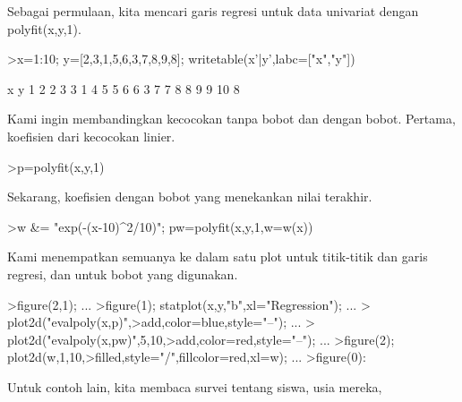 \documentclass[a4paper,10pt]{article}
\begin{document}
\begin{eulernotebook}
\begin{eulercomment}
\begin{eulercomment}
\begin{eulercomment}
\begin{eulercomment}
\begin{eulercomment}
\begin{eulercomment}
\begin{eulercomment}
\begin{eulercomment}
\begin{eulercomment}
\begin{eulercomment}
\begin{eulercomment}
\begin{eulercomment}
\begin{eulercomment}
\begin{eulercomment}
\begin{eulercomment}
\begin{eulercomment}
\begin{eulercomment}
\begin{eulercomment}
\begin{eulercomment}
Sebagai permulaan, kita mencari garis regresi untuk data univariat
dengan polyfit(x,y,1).
\end{eulercomment}
\begin{eulerprompt}
>x=1:10; y=[2,3,1,5,6,3,7,8,9,8]; writetable(x'|y',labc=["x","y"])
\end{eulerprompt}
\begin{euleroutput}
           x         y
           1         2
           2         3
           3         1
           4         5
           5         6
           6         3
           7         7
           8         8
           9         9
          10         8
\end{euleroutput}
\begin{eulercomment}
Kami ingin membandingkan kecocokan tanpa bobot dan dengan bobot.
Pertama, koefisien dari kecocokan linier.
\end{eulercomment}
\begin{eulerprompt}
>p=polyfit(x,y,1)
\end{eulerprompt}
\begin{euleroutput}
  [0.733333,  0.812121]
\end{euleroutput}
\begin{eulercomment}
Sekarang, koefisien dengan bobot yang menekankan nilai terakhir.
\end{eulercomment}
\begin{eulerprompt}
>w &= "exp(-(x-10)^2/10)"; pw=polyfit(x,y,1,w=w(x))
\end{eulerprompt}
\begin{euleroutput}
  [4.71566,  0.38319]
\end{euleroutput}
\begin{eulercomment}
Kami menempatkan semuanya ke dalam satu plot untuk titik-titik dan
garis regresi, dan untuk bobot yang digunakan.
\end{eulercomment}
\begin{eulerprompt}
>figure(2,1);  ...
>figure(1); statplot(x,y,"b",xl="Regression"); ...
>  plot2d("evalpoly(x,p)",>add,color=blue,style="--"); ...
>  plot2d("evalpoly(x,pw)",5,10,>add,color=red,style="--"); ...
>figure(2); plot2d(w,1,10,>filled,style="/",fillcolor=red,xl=w); ...
>figure(0):
\end{eulerprompt}
\begin{eulercomment}
Untuk contoh lain, kita membaca survei tentang siswa, usia mereka,

\end{eulercomment}
\end{eulercomment}
\end{eulercomment}
\end{eulercomment}
\end{eulercomment}
\end{eulercomment}
\end{eulercomment}
\end{eulercomment}
\end{eulercomment}
\end{eulercomment}
\end{eulercomment}
\end{eulercomment}
\end{eulercomment}
\end{eulercomment}
\end{eulercomment}
\end{eulercomment}
\end{eulercomment}
\end{eulercomment}
\end{eulercomment}
\end{eulernotebook}
\end{document}

